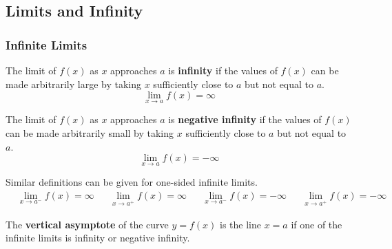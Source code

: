 \subsection{Limits and Infinity}
\subsubsection{Infinite Limits}
\begin{definition}
    The limit of \(f(x)\) as \(x\) approaches \(a\) is \textbf{infinity} if
    the values of \(f(x)\) can be made arbitrarily large by taking \(x\)
    sufficiently close to \(a\) but not equal to \(a\).
    \[\lim_{x\to a}f(x)=\infty\]
\end{definition}
\begin{definition}
    The limit of \(f(x)\) as \(x\) approaches \(a\) is \textbf{negative infinity}
    if the values of \(f(x)\) can be made arbitrarily small by taking \(x\)
    sufficiently close to \(a\) but not equal to \(a\).
    \[\lim_{x\to a}f(x)=-\infty\]
\end{definition}
Similar definitions can be given for one-sided infinite limits.
\begin{align*}
    &\lim_{x\to a^-}f(x)=\infty&&\lim_{x\to a^+}f(x)=\infty&
    &\lim_{x\to a^-}f(x)=-\infty&&\lim_{x\to a^+}f(x)=-\infty&
\end{align*}
\begin{definition}
    The \textbf{vertical asymptote} of the curve \(y=f(x)\) is the line \(x=a\)
    if one of the infinite limits is infinity or negative infinity.
\end{definition}

